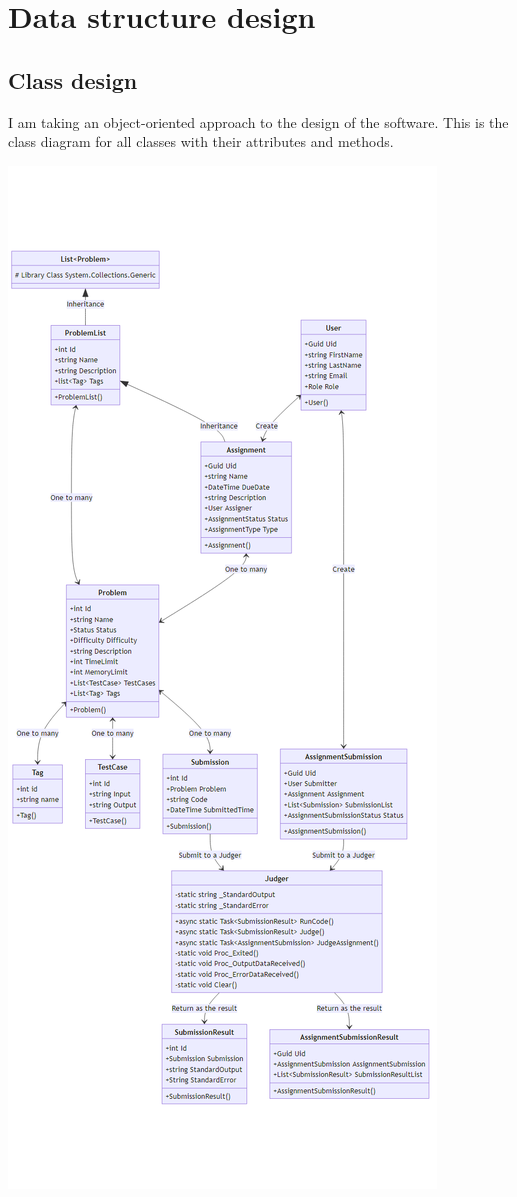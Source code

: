 \documentclass[a4paper]{report}
\begin{document}
\section{Data structure design}

\subsection{Class design}

I am taking an object-oriented approach to the design of the software. This is the class diagram for all classes with their attributes and methods.

\includegraphics[width=\textwidth, height=\textheight, keepaspectratio]{classDiagram}
\end{document}
